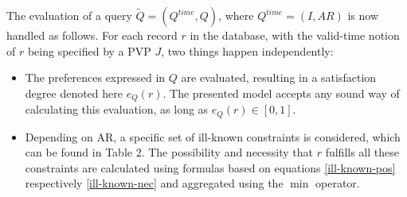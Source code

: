 The evaluation of a query $\tilde{Q} = \left( Q^{time}, Q \right)$, where $Q^{time} = \left( I, AR \right)$ is now handled as follows. For each record $r$ in the database, with the valid-time notion of $r$ being specified by a PVP $J$, two things happen independently:



\begin{itemize}
\item
The preferences expressed in $Q$ are evaluated, resulting in a satisfaction degree denoted here $e_{Q}(r)$. The presented model accepts any sound way of calculating this evaluation, as long as $e_{Q}(r) \in \left[0,1\right]$. 
\item
Depending on AR, a specific set of ill-known constraints is considered, which can be found in Table 2. The possibility and necessity that $r$ fulfills all these constraints are calculated using formulas based on equations \eqref{ill-known-pos} respectively \eqref{ill-known-nec} and aggregated using the $\min$ operator. 


\end{itemize}


